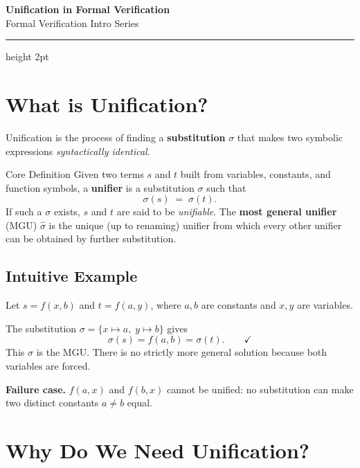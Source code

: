 \documentclass[11pt, a4paper]{article}
\begin{document}
 
\begin{center}
    {\LARGE \textbf{Unification in Formal Verification}}\\[0.4em]
    {\small\color{gray} Formal Verification Intro Series}
\end{center}
 
\vspace{0.5em}
\hrule height 2pt
\vspace{1.2em}
 
\section{What is Unification?}
 
Unification is the process of finding a \textbf{substitution} $\sigma$ that makes two
symbolic expressions \emph{syntactically identical}.
 
\begin{defbox}{Core Definition}
Given two terms $s$ and $t$ built from variables, constants, and function symbols,
a \textbf{unifier} is a substitution $\sigma$ such that
\[
    \sigma(s) \;=\; \sigma(t).
\]
If such a $\sigma$ exists, $s$ and $t$ are said to be \emph{unifiable}.
The \textbf{most general unifier} (MGU) $\hat\sigma$ is the unique (up to renaming)
unifier from which every other unifier can be obtained by further substitution.
\end{defbox}
 
\subsection{Intuitive Example}
 
Let $s = f(x, b)$ and $t = f(a, y)$, where $a, b$ are constants and $x, y$ are variables.
 
The substitution $\sigma = \{x \mapsto a,\; y \mapsto b\}$ gives
\[
    \sigma(s) = f(a,b) = \sigma(t). \qquad \checkmark
\]
This $\sigma$ is the MGU. There is no strictly more general solution because both
variables are forced.
 
\vspace{0.5em}
\noindent\textbf{Failure case.} $f(a, x)$ and $f(b, x)$ cannot be unified: no substitution
can make two distinct constants $a \neq b$ equal.
 
\section{Why Do We Need Unification?}
 
\end{document}
